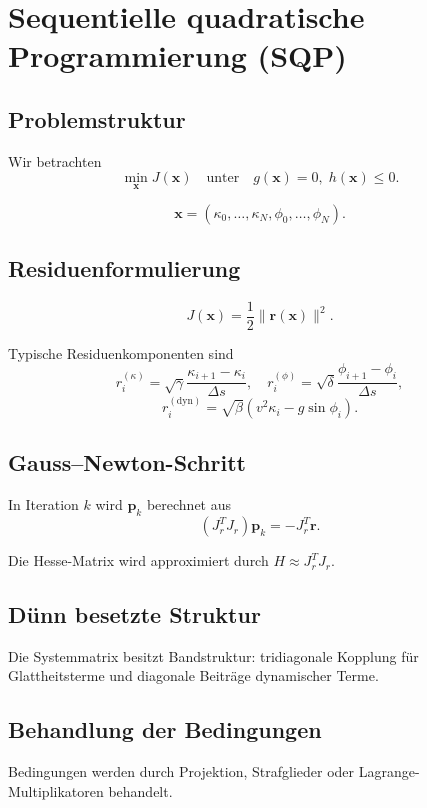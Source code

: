 \section{Sequentielle quadratische Programmierung (SQP)}
\subsection{Problemstruktur}
Wir betrachten
\[
\min_{\mathbf x}J(\mathbf x)
\quad\text{unter}\quad g(\mathbf x)=0,\;h(\mathbf x)\leq0.
\]
\begin{definition}[Parametervektor]
\[
\mathbf x=(\kappa_0,\dots,\kappa_N,\phi_0,\dots,\phi_N).
\]
\end{definition}

\subsection{Residuenformulierung}
\begin{definition}[Residuenvektor]
\[
J(\mathbf x)=\frac12\|\mathbf r(\mathbf x)\|^2.
\]
\end{definition}
Typische Residuenkomponenten sind
\[
r_i^{(\kappa)}=\sqrt\gamma\frac{\kappa_{i+1}-\kappa_i}{\Delta s},
\quad
r_i^{(\phi)}=\sqrt\delta\frac{\phi_{i+1}-\phi_i}{\Delta s},
\]
\[
r_i^{(\mathrm{dyn})}=\sqrt\beta(v^2\kappa_i-g\sin\phi_i).
\]

\subsection{Gauss--Newton-Schritt}
\begin{definition}
In Iteration \(k\) wird \(\mathbf p_k\) berechnet aus
\[
(J_r^T J_r)\mathbf p_k=-J_r^T\mathbf r.
\]
\end{definition}
Die Hesse-Matrix wird approximiert durch \(H\approx J_r^T J_r\).

\subsection{Dünn besetzte Struktur}
Die Systemmatrix besitzt Bandstruktur: tridiagonale Kopplung für
Glattheitsterme und diagonale Beiträge dynamischer Terme.

\subsection{Behandlung der Bedingungen}
Bedingungen werden durch Projektion, Strafglieder oder Lagrange-Multiplikatoren
behandelt.

